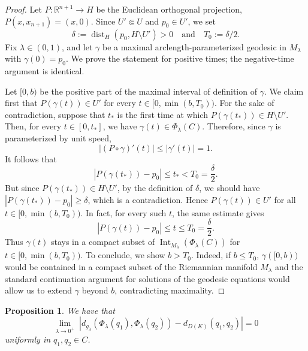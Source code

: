 \documentclass[11pt]{article}
\theoremstyle{definition}
\theoremstyle{remark}
\theoremstyle{plain}
\newtheorem{proposition}[definition]{Proposition}
\DeclareMathOperator{\Int}{Int}
\newcommand{\M}{M_\lambda}
\begin{document}
\begin{proof}
Let $P:\mathbb R^{n+1}\to H$ be the Euclidean orthogonal projection,
$P(x,x_{n+1})=(x,0)$. Since $U'\Subset U$ and $p_0\in U'$, we set 
$$\delta:=\operatorname{dist}_{H}(p_0,H\setminus U')>0 \quad \mbox{and}\quad T_0 := \delta/2.$$
Fix $\lambda\in(0,1)$, and let $\gamma$ be a maximal
arclength-parameterized geodesic in $\M$ with $\gamma(0)=p_0$. We prove the statement for positive times; the negative-time argument is identical.

Let $[0,b)$ be the positive part of the maximal interval of definition
of $\gamma$. We claim first that $P(\gamma(t))\in U'$ for every
$t\in [0,\min(b,T_0))$. For the sake of contradiction, suppose that $t_*$ is the first time at which $P(\gamma(t_*))\in H\setminus U'$. Then, for every $t\in[0,t_*]$, we have $\gamma(t)\in \Phi_\lambda(C)$. Therefore, since $\gamma$ is parameterized by unit speed,
$$|(P\circ\gamma)'(t)|
\le |\gamma'(t)|
= 1.$$
It follows that
$$|P(\gamma(t_*))-p_0|
\le t_*
< T_0 =\frac{\delta}{2}.$$
But since $P(\gamma(t_*))\in H\setminus U'$, by the definition of $\delta$, we should have $|P(\gamma(t_*))-p_0|\ge \delta$, which is a contradiction. Hence $P(\gamma(t))\in U'$ for all
$t\in [0,\min(b,T_0))$. In fact, for every such $t$, the same estimate gives
$$|P(\gamma(t))-p_0|\le t\le T_0=\frac{\delta}{2}.$$
Thus \(\gamma(t)\) stays in a compact subset of
$\Int_{\M}(\Phi_\lambda(C))$ for $t\in [0,\min(b,T_0))$. To conclude, we show $b>T_0$. Indeed, if $b\le T_0$, $\gamma([0,b))$ would be contained in a compact subset of the Riemannian manifold $\M$ and the standard continuation argument for solutions of the geodesic equations would allow us to extend $\gamma$ beyond $b$, contradicting maximality.
\end{proof}
    
\begin{proposition}
  We have that
  $$\lim_{\lambda\to 0^+}\;\left|d_{g_\lambda}(\Phi_\lambda(q_1), \Phi_\lambda(q_2)) - d_{D(K)}(q_1,q_2)\right| = 0$$
  uniformly in $q_1,q_2\in C$.
\end{proposition}
\end{document}
